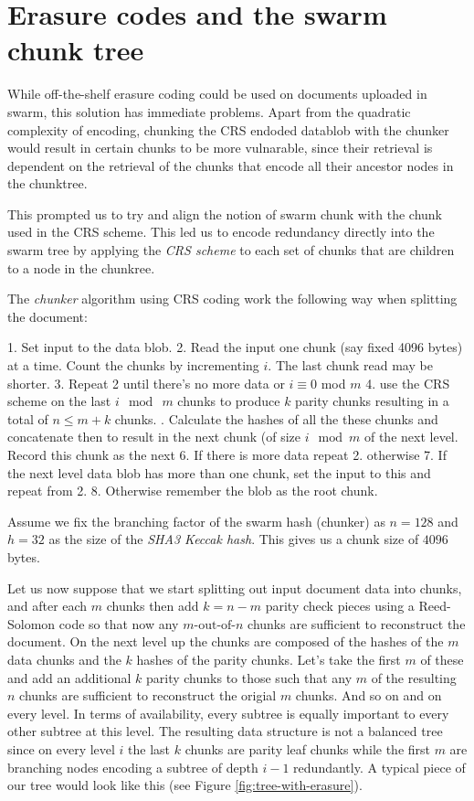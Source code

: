 \documentclass[12pt]{article}
\begin{document}
{\section{Erasure codes and the swarm chunk tree}

While off-the-shelf erasure coding could be used on documents uploaded in swarm, this solution has immediate problems. Apart from the quadratic complexity of encoding, chunking the CRS endoded datablob with the chunker would result in certain chunks to be more vulnarable, since their retrieval is dependent on the retrieval of the chunks that encode all their ancestor nodes in the chunktree.

This prompted us to try and align the notion of swarm chunk with the chunk used in the CRS scheme. This led us to encode redundancy directly into the swarm tree by applying the \emph{CRS scheme}  to each set of chunks that are children to a node in the chunkree.

The \emph{chunker} algorithm using CRS coding work the following way when splitting the document:

 1. Set input to the data blob.
 2. Read the input one chunk (say fixed 4096 bytes) at a time. Count the chunks by incrementing $i$. The last chunk read may be shorter.
 3. Repeat 2 until there's no more data or $i \equiv 0$ mod $m$
 4. use the CRS scheme on the last $i \mod\ m$ chunks to produce $k$ parity chunks resulting in a total of $n \leq m+k$ chunks.
 . Calculate the hashes of all the these chunks and concatenate then to result in the next chunk (of size $i\mod m$ of the next level. Record this chunk as the next
 6. If there is more data repeat 2. otherwise
 7. If the next level data blob has more than one chunk, set the input to this and  repeat from 2.
 8. Otherwise remember the blob as the root chunk.

Assume we fix the branching factor of the swarm hash (chunker) as $n=128$ and $h=32$ as the size of the \emph{SHA3 Keccak hash}. This gives us a chunk size of $4096$ bytes.

Let us now suppose that we start splitting out input document data into chunks, and after each $m$ chunks then add $k=n-m$ parity check pieces using a Reed-Solomon code so that now any $m\text{-out-of-}n$ chunks are
sufficient to reconstruct the document. On the next level up the chunks are composed of the hashes of the $m$  data chunks and the $k$ hashes of the parity chunks. Let's take the first $m$
of these and add an additional $k$ parity chunks to those such that any $m$ of the resulting $n$
chunks are sufficient to reconstruct the origial $m$ chunks. And so on and on every level. In terms of
availability, every subtree is equally important to every other subtree at this level. The resulting
data structure is not a balanced tree since on every level $i$ the last $k$ chunks are parity leaf
chunks while the first $m$ are branching nodes encoding a subtree of depth $i-1$ redundantly.
A typical piece of our tree would look like this (see Figure \ref{fig:tree-with-erasure}).


}
\end{document}
